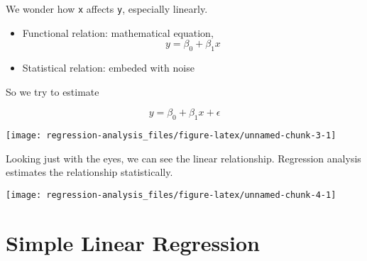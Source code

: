 \documentclass[]{book}
\newenvironment{Shaded}{\begin{snugshade}}{\end{snugshade}}
\newcommand{\KeywordTok}[1]{\textcolor[rgb]{0.13,0.29,0.53}{\textbf{#1}}}
\newcommand{\DataTypeTok}[1]{\textcolor[rgb]{0.13,0.29,0.53}{#1}}
\newcommand{\StringTok}[1]{\textcolor[rgb]{0.31,0.60,0.02}{#1}}
\newcommand{\OperatorTok}[1]{\textcolor[rgb]{0.81,0.36,0.00}{\textbf{#1}}}
\newcommand{\NormalTok}[1]{#1}
\providecommand{\tightlist}{%
  \setlength{\itemsep}{0pt}\setlength{\parskip}{0pt}}
\theoremstyle{definition}
\theoremstyle{definition}
\theoremstyle{definition}
\theoremstyle{remark}
\begin{document}
We wonder how \texttt{x} affects \texttt{y}, especially linearly.

\begin{itemize}
\tightlist
\item
  Functional relation: mathematical equation,
  \[y = \beta_0 + \beta_1 x\]
\item
  Statistical relation: embeded with noise
\end{itemize}

So we try to estimate

\[y = \beta_0 + \beta_1 x + \epsilon\]

\begin{Shaded}
\end{Shaded}

\begin{center}\texttt{[image: regression-analysis\_files/figure-latex/unnamed-chunk-3-1]} \end{center}

Looking just with the eyes, we can see the linear relationship.
Regression analysis estimates the relationship statistically.

\begin{Shaded}
\end{Shaded}

\begin{center}\texttt{[image: regression-analysis\_files/figure-latex/unnamed-chunk-4-1]} \end{center}

\chapter{Simple Linear Regression}\label{simple}
\end{document}
